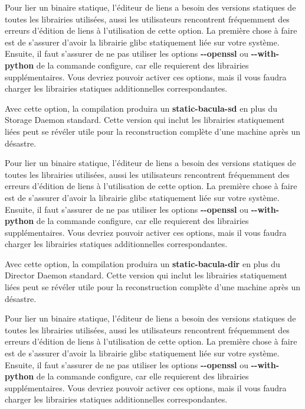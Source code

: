 {{{\begin{description}
{Pour lier un binaire statique, l'\'editeur de liens a besoin des versions 
statiques de toutes les librairies utilis\'ees, aussi les utilisateurs 
rencontrent fr\'equemment des erreurs d'\'edition de liens \`a l'utilisation 
de cette option. La premi\`ere chose \`a faire est de s'assurer d'avoir la 
librairie glibc statiquement li\'ee sur votre syst\`eme. Ensuite, il faut 
s'assurer de ne pas utiliser les options {\bf {-}{-}openssl} ou 
{\bf {-}{-}with-python} de la commande configure, car elle requierent des 
librairies suppl\'ementaires. Vous devriez pouvoir activer ces options, mais 
il vous faudra charger les librairies statiques additionnelles correspondantes.

\item [{-}{-}enable-static-sd]
   Avec cette option, la compilation produira un {\bf static-bacula-sd}  en plus
du Storage Daemon standard. Cette version qui inclut les librairies
statiquement  li\'ees peut se r\'ev\'eler utile pour la reconstruction
compl\`ete d'une machine apr\`es un d\'esastre.  

Pour lier un binaire statique, l'\'editeur de liens a besoin des versions
statiques de toutes les librairies utilis\'ees, aussi les utilisateurs
rencontrent fr\'equemment des erreurs d'\'edition de liens \`a l'utilisation
de cette option. La premi\`ere chose \`a faire est de s'assurer d'avoir la
librairie glibc statiquement li\'ee sur votre syst\`eme. Ensuite, il faut
s'assurer de ne pas utiliser les options {\bf {-}{-}openssl} ou
{\bf {-}{-}with-python} de la commande configure, car elle requierent des
librairies suppl\'ementaires. Vous devriez pouvoir activer ces options, mais
il vous faudra charger les librairies statiques additionnelles correspondantes.

\item [{-}{-}enable-static-dir]
   Avec cette option, la compilation produira un {\bf static-bacula-dir}  en plus
du Director Daemon standard. Cette version qui inclut les librairies
statiquement  li\'ees peut se r\'ev\'eler utile pour la reconstruction
compl\`ete d'une machine apr\`es un d\'esastre.  

Pour lier un binaire statique, l'\'editeur de liens a besoin des versions
statiques de toutes les librairies utilis\'ees, aussi les utilisateurs
rencontrent fr\'equemment des erreurs d'\'edition de liens \`a l'utilisation
de cette option. La premi\`ere chose \`a faire est de s'assurer d'avoir la
librairie glibc statiquement li\'ee sur votre syst\`eme. Ensuite, il faut
s'assurer de ne pas utiliser les options {\bf {-}{-}openssl} ou
{\bf {-}{-}with-python} de la commande configure, car elle requierent des
librairies suppl\'ementaires. Vous devriez pouvoir activer ces options, mais
il vous faudra charger les librairies statiques additionnelles correspondantes.

}
\end{description}}}}

